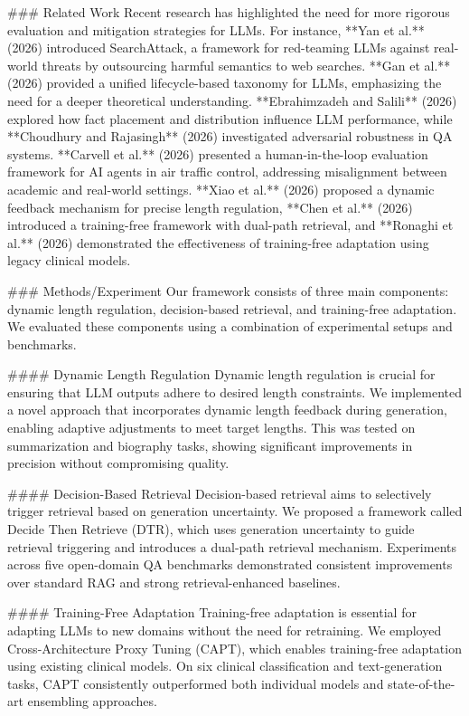### Related Work
Recent research has highlighted the need for more rigorous evaluation and mitigation strategies for LLMs. For instance, **Yan et al.** (2026) introduced SearchAttack, a framework for red-teaming LLMs against real-world threats by outsourcing harmful semantics to web searches. **Gan et al.** (2026) provided a unified lifecycle-based taxonomy for LLMs, emphasizing the need for a deeper theoretical understanding. **Ebrahimzadeh and Salili** (2026) explored how fact placement and distribution influence LLM performance, while **Choudhury and Rajasingh** (2026) investigated adversarial robustness in QA systems. **Carvell et al.** (2026) presented a human-in-the-loop evaluation framework for AI agents in air traffic control, addressing misalignment between academic and real-world settings. **Xiao et al.** (2026) proposed a dynamic feedback mechanism for precise length regulation, **Chen et al.** (2026) introduced a training-free framework with dual-path retrieval, and **Ronaghi et al.** (2026) demonstrated the effectiveness of training-free adaptation using legacy clinical models.

### Methods/Experiment
Our framework consists of three main components: dynamic length regulation, decision-based retrieval, and training-free adaptation. We evaluated these components using a combination of experimental setups and benchmarks.

#### Dynamic Length Regulation
Dynamic length regulation is crucial for ensuring that LLM outputs adhere to desired length constraints. We implemented a novel approach that incorporates dynamic length feedback during generation, enabling adaptive adjustments to meet target lengths. This was tested on summarization and biography tasks, showing significant improvements in precision without compromising quality.

#### Decision-Based Retrieval
Decision-based retrieval aims to selectively trigger retrieval based on generation uncertainty. We proposed a framework called Decide Then Retrieve (DTR), which uses generation uncertainty to guide retrieval triggering and introduces a dual-path retrieval mechanism. Experiments across five open-domain QA benchmarks demonstrated consistent improvements over standard RAG and strong retrieval-enhanced baselines.

#### Training-Free Adaptation
Training-free adaptation is essential for adapting LLMs to new domains without the need for retraining. We employed Cross-Architecture Proxy Tuning (CAPT), which enables training-free adaptation using existing clinical models. On six clinical classification and text-generation tasks, CAPT consistently outperformed both individual models and state-of-the-art ensembling approaches.

